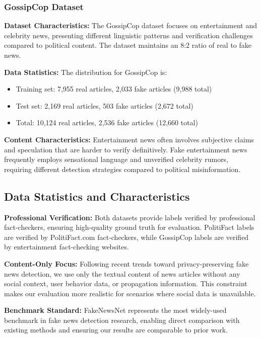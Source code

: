 \subsubsection{GossipCop Dataset}

\textbf{Dataset Characteristics:} The GossipCop dataset focuses on entertainment and celebrity news, presenting different linguistic patterns and verification challenges compared to political content. The dataset maintains an 8:2 ratio of real to fake news.

\textbf{Data Statistics:} The distribution for GossipCop is:
\begin{itemize}
\item Training set: 7,955 real articles, 2,033 fake articles (9,988 total)
\item Test set: 2,169 real articles, 503 fake articles (2,672 total)
\item Total: 10,124 real articles, 2,536 fake articles (12,660 total)
\end{itemize}

\textbf{Content Characteristics:} Entertainment news often involves subjective claims and speculation that are harder to verify definitively. Fake entertainment news frequently employs sensational language and unverified celebrity rumors, requiring different detection strategies compared to political misinformation.

\subsection{Data Statistics and Characteristics}

\textbf{Professional Verification:} Both datasets provide labels verified by professional fact-checkers, ensuring high-quality ground truth for evaluation. PolitiFact labels are verified by PolitiFact.com fact-checkers, while GossipCop labels are verified by entertainment fact-checking websites.

\textbf{Content-Only Focus:} Following recent trends toward privacy-preserving fake news detection, we use only the textual content of news articles without any social context, user behavior data, or propagation information. This constraint makes our evaluation more realistic for scenarios where social data is unavailable.

\textbf{Benchmark Standard:} FakeNewsNet represents the most widely-used benchmark in fake news detection research, enabling direct comparison with existing methods and ensuring our results are comparable to prior work.

